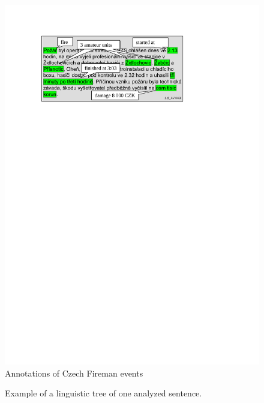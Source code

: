 \begin{figure}
\centering
\includegraphics[width=0.65\hsize]{fireman_annotated}
\caption{Annotations of Czech Fireman events}
\label{fig:fireman_annotated}
\end{figure}


\begin{figure}
\centerline{}
\caption{Example of a linguistic tree of one analyzed sentence.}
\label{fig:intro_damage_tree} 
\end{figure}


